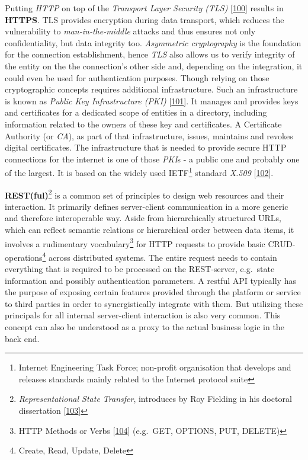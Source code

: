 \documentclass[12pt,english,a4paper,titlepage,cleardoublepage=empty,dottedtoc]{report}
\begin{document}
Putting \emph{HTTP} on top of the \emph{Transport Layer Security (TLS)}
{[}\protect\hyperlink{ref-web_spec_tls}{100}{]} results in
\textbf{\protect\hypertarget{def--https}{}{HTTPS}}. TLS provides
encryption during data transport, which reduces the vulnerability to
\emph{man-in-the-middle} attacks and thus ensures not only
confidentiality, but data integrity too. \emph{Asymmetric cryptography}
is the foundation for the connection establishment, hence \emph{TLS}
also allows us to verify integrity of the entity on the the connection's
other side and, depending on the integration, it could even be used for
authentication purposes. Though relying on those cryptographic concepts
requires additional infrastructure. Such an infrastructure is known as
\emph{Public Key Infrastructure (PKI)}
{[}\protect\hyperlink{ref-book_2014_chapter-14-5-pki}{101}{]}. It
manages and provides keys and certificates for a dedicated scope of
entities in a directory, including information related to the owners of
these key and certificates. A Certificate Authority (or \emph{CA}), as
part of that infrastructure, issues, maintains and revokes digital
certificates. The infrastructure that is needed to provide secure HTTP
connections for the internet is one of those \emph{PKI}s - a public one
and probably one of the largest. It is based on the widely used
IETF\footnote{Internet Engineering Task Force; non-profit organisation
  that develops and releases standards mainly related to the Internet
  protocol suite} standard \emph{X.509}
{[}\protect\hyperlink{ref-web_spec_x509}{102}{]}.

\textbf{REST(ful)}\footnote{\emph{Representational State Transfer},
  introduces by Roy Fielding in his doctoral dissertation
  {[}\protect\hyperlink{ref-web_spec_rest}{103}{]}} is a common set of
principles to design web resources and their interaction. It primarily
defines server-client communication in a more generic and therefore
interoperable way. Aside from hierarchically structured URLs, which can
reflect semantic relations or hierarchical order between data items, it
involves a rudimentary vocabulary\footnote{HTTP Methods or Verbs
  {[}\protect\hyperlink{ref-web_spec_http-methods}{104}{]} (e.g.~GET,
  OPTIONS, PUT, DELETE)} for HTTP requests to provide basic
CRUD-operations\footnote{Create, Read, Update, Delete} across
distributed systems. The entire request needs to contain everything that
is required to be processed on the REST-server, e.g.~state information
and possibly authentication parameters. A restful API typically has the
purpose of exposing certain features provided through the platform or
service to third parties in order to synergistically integrate with
them. But utilizing these principals for all internal server-client
interaction is also very common. This concept can also be understood as
a proxy to the actual business logic in the back end.
\end{document}
